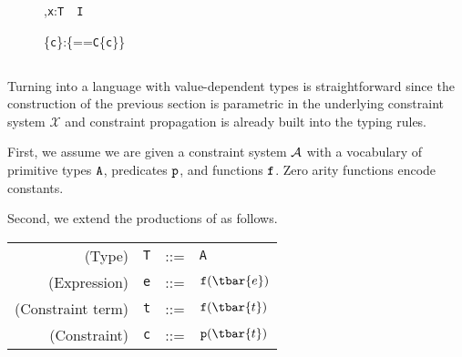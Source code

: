 \begin{figure*}
\vspace{-\bigskipamount}
\begin{minipage}{.5\textwidth}
\quad
{}
\infax[W-Type]
	{\wj{}{\type}}

	{}

	{\Gamma,{\tt x}:{\tt T}~\underline\has~{\tt I}}
\end{minipage}%
\begin{minipage}{.5\textwidth}
\quad{}

	{\Gamma{}}

  {\Gamma{}\{{\tt c}\}:\type\{\self=={\tt C}\{{\tt c}\}\}}
\end{minipage}
\caption{\FXG}
\label{fig:FXG}
\end{figure*}

\subsection{\FXD}

Turning \FXZ{} into a language with value-dependent types is straightforward
since the construction of the previous section is parametric in the underlying constraint system $\mathcal{X}$ and constraint propagation is already built into the typing rules.

First, we assume we are given a constraint system $\cal A$ with a vocabulary of primitive types ${\tt A}$,
predicates ${\tt p}$, and functions ${\tt f}$.  Zero arity
functions encode constants.

Second, we extend the productions of \FXZ{} as follows.
\begin{center}
\begin{tabular}{r@{\quad}rcl}
  (Type)& {\tt T} &{::=}& {\tt A} \\
  (Expression) & {\tt e} &{::=}& ${\tt f}(\tbar{e})$ \\
  (Constraint term) & {\tt t} &{::=}& ${\tt f}(\tbar{t})$ \\
  (Constraint) & {\tt c} &{::=}& ${\tt p}(\tbar{t})$ \\  
\end{tabular}
\end{center}

